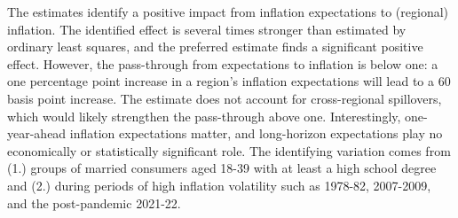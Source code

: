 \documentclass[12pt]{article}
\begin{document}
The estimates identify a positive impact from inflation expectations to (regional) inflation. The identified effect is several times stronger than estimated by ordinary least squares, and the preferred estimate finds a significant positive effect. However, the pass-through from expectations to inflation is below one: a one percentage point increase in a region's inflation expectations will lead to a 60 basis point increase. The estimate does not account for cross-regional spillovers, which would likely strengthen the pass-through above one. Interestingly, one-year-ahead inflation expectations matter, and long-horizon expectations play no economically or statistically significant role. The identifying variation comes from (1.) groups of married consumers aged 18-39 with at least a high school degree and (2.) during periods of high inflation volatility such as 1978-82, 2007-2009, and the post-pandemic 2021-22.

\pagebreak

%



%

%

\end{document}
